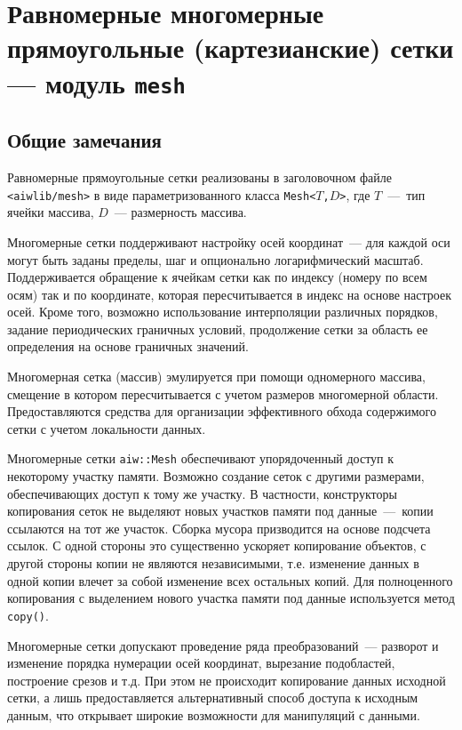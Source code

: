 \section{Равномерные многомерные прямоугольные (картезианские) сетки --- модуль {\tt mesh}}\label{mesh:sec}
\subsection{Общие замечания}
Равномерные прямоугольные сетки реализованы в заголовочном файле
{\tt <aiwlib/mesh>}  в виде параметризованного класса {\tt Mesh<$T$,$D$>}, где $T$~---~тип ячейки массива, $D$~---
размерность массива. 

Многомерные сетки поддерживают настройку осей координат~--- для каждой оси могут быть заданы пределы, шаг
и опционально логарифмический масштаб. Поддерживается обращение к ячейкам сетки как по индексу (номеру по всем осям)
так и по координате, которая пересчитывается в индекс на основе настроек осей.
Кроме того, возможно использование интерполяции различных порядков, задание периодических граничных условий, продолжение сетки за область ее определения
на основе граничных значений.

Многомерная сетка (массив) эмулируется при помощи
одномерного массива, смещение в котором пересчитывается с учетом размеров
многомерной области. Предоставляются средства для организации эффективного обхода содержимого сетки  с учетом локальности данных.

Многомерные сетки {\tt aiw::Mesh} обеспечивают упорядоченный доступ к некоторому участку памяти.
Возможно создание сеток с другими размерами, обеспечивающих доступ
к тому же участку. В частности, конструкторы копирования сеток не
выделяют новых участков памяти под данные~---~копии ссылаются на тот же
участок. Сборка мусора призводится на основе подсчета ссылок.  С одной
стороны это существенно ускоряет копирование объектов, с другой стороны копии не являются
независимыми, т.е. изменение данных в одной копии влечет за собой изменение всех
остальных копий. Для полноценного копирования с выделением нового участка
памяти под данные используется метод {\tt copy()}.

Многомерные сетки допускают проведение ряда преобразований~--- разворот и изменение порядка нумерации осей координат, 
вырезание подобластей, построение срезов и т.д. При этом не происходит копирование данных исходной сетки, а лишь предоставляется 
альтернативный способ доступа к исходным данным, что открывает широкие возможности для манипуляций с данными.

